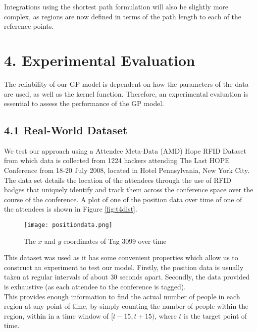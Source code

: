 \documentclass[letterpaper]{article}
\begin{document}
Integrations using the shortest path formulation will also be slightly more complex, as regions are now defined in terms of the path length to each of the reference points.

\section{4.  Experimental Evaluation}

The reliability of our GP model is dependent on how the parameters of the data are used, as well as the kernel function. Therefore, an experimental evaluation is essential to assess the performance of the GP model.

\subsection{4.1  Real-World Dataset}

We test our approach using a Attendee Meta-Data (AMD) Hope RFID Dataset from which data is collected from 1224 hackers attending The Last HOPE Conference from 18-20 July 2008, located in Hotel Pennsylvania, New York City.\\

The data set details the location of the attendees through the use of RFID badges that uniquely identify and track them across the conference space over the course of the conference. A plot of one of the position data over time of one of the attendees is shown in Figure \ref{fig:t4dist}.\\

\begin{figure}[h!]
  \centering
    \texttt{[image: positiondata.png]}
  \caption{The $x$ and $y$ coordinates of Tag 3099 over time}
  \label{fig:spaths}
\end{figure}

This dataset was used as it has some convenient properties which allow us to construct an experiment to test our model. Firstly, the position data is usually taken at regular intervals of about $30$ seconds apart. Secondly, the data provided is exhaustive (as each attendee to the conference is tagged). \\

This provides enough information to find the actual number of people in each region at any point of time, by simply counting the number of people within the region, within in a time window of $[t-15,t+15)$, where $t$ is the target point of time.
\end{document}
